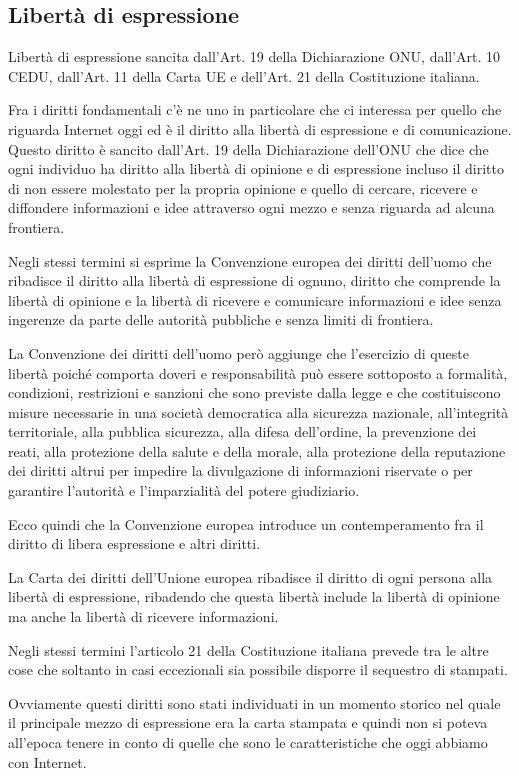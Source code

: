 \subsection{Libertà di espressione}
Libertà di espressione sancita dall'Art. 19 della Dichiarazione ONU, dall'Art. 10 CEDU, dall'Art. 11 della Carta UE e dell'Art. 21 della Costituzione italiana. \par
Fra i diritti fondamentali c'è ne uno in particolare che ci interessa per quello che riguarda Internet oggi ed è il diritto alla libertà di espressione e di comunicazione. Questo diritto è sancito dall'Art. 19 della Dichiarazione dell'ONU che dice che ogni individuo ha diritto alla libertà di opinione e di espressione incluso il diritto di non essere molestato per la propria opinione e quello di cercare, ricevere e diffondere informazioni e idee attraverso ogni mezzo e senza riguarda ad alcuna frontiera.\par
Negli stessi termini si esprime la Convenzione europea dei diritti dell'uomo che ribadisce il diritto alla libertà di espressione di ognuno, diritto che comprende la libertà di opinione e la libertà di ricevere e comunicare informazioni e idee senza ingerenze da parte delle autorità pubbliche e senza limiti di frontiera. \par
La Convenzione dei diritti dell'uomo però aggiunge che l'esercizio di queste libertà poiché comporta doveri e responsabilità può essere sottoposto a formalità, condizioni, restrizioni e sanzioni che sono previste dalla legge e che costituiscono misure necessarie in una società democratica alla sicurezza nazionale, all'integrità territoriale, alla pubblica sicurezza, alla difesa dell'ordine, la prevenzione dei reati, alla protezione della salute e della morale, alla protezione della reputazione dei diritti altrui per impedire la divulgazione di informazioni riservate o per garantire l'autorità e l'imparzialità del potere giudiziario.
\par
Ecco quindi che la Convenzione europea introduce un contemperamento fra il diritto di libera espressione e altri diritti. \par
La Carta dei diritti dell'Unione europea ribadisce il diritto di ogni persona alla libertà di espressione, ribadendo che questa libertà include la libertà di opinione ma anche la libertà di ricevere informazioni. \par
Negli stessi termini l'articolo 21 della Costituzione italiana prevede tra le altre cose che soltanto in casi eccezionali sia possibile disporre il sequestro di stampati.\par
Ovviamente questi diritti sono stati individuati in un momento storico nel quale il principale mezzo di espressione era la carta stampata e quindi non si poteva all'epoca tenere in conto di quelle che sono le caratteristiche che oggi abbiamo con Internet.

